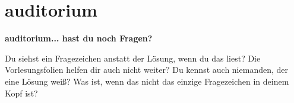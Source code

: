 \section{auditorium}

\textbf{auditorium... hast du noch Fragen?}

Du siehst ein Fragezeichen anstatt der Lösung, wenn du das liest? Die Vorlesungsfolien helfen dir auch nicht weiter? Du kennst auch niemanden, der eine Lösung weiß? Was ist, wenn das nicht das einzige Fragezeichen in deinem Kopf ist?